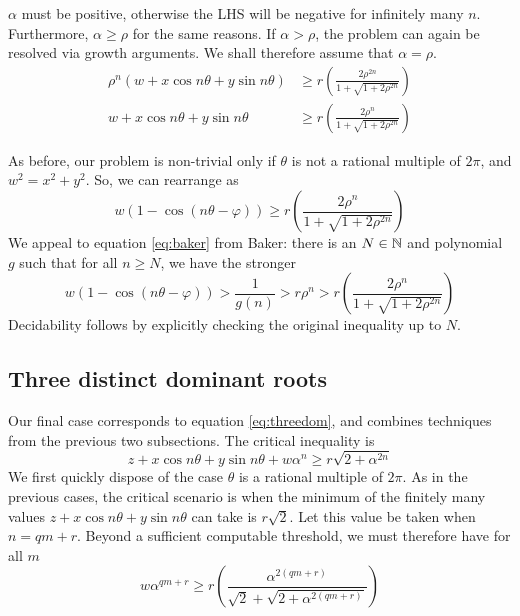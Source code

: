 $\alpha$ must be positive, otherwise the LHS will be negative for infinitely many $n$. Furthermore, $\alpha \ge \rho$ for the same reasons. If $\alpha > \rho$, the problem can again be resolved via growth arguments. We shall therefore assume that $\alpha = \rho$. 
\begin{align}
\rho^n(w + x \cos n\theta + y \sin n \theta) &\ge r\left(\frac{2\rho^{2n}}{1 + \sqrt{1 + 2\rho^{2n}}}\right) \\
w + x \cos n\theta + y \sin n \theta &\ge r\left(\frac{2\rho^{n}}{1 + \sqrt{1 + 2\rho^{2n}}}\right)
\end{align}

As before, our problem is non-trivial only if $\theta$ is not a rational multiple of $2\pi$, and $w^2 = x^2 + y^2$. So, we can rearrange as 
\begin{equation}
w(1 - \cos(n\theta - \varphi)) \ge r\left(\frac{2\rho^{n}}{1 + \sqrt{1 + 2\rho^{2n}}}\right)
\end{equation}
We appeal to equation \ref{eq:baker} from Baker: there is an $N \in \mathbb{N}$ and polynomial $g$ such that for all $n \ge N$, we have the stronger
\begin{equation}
w(1 - \cos(n\theta - \varphi)) > \frac{1}{g(n)} > r \rho^n >  r\left(\frac{2\rho^{n}}{1 + \sqrt{1 + 2\rho^{2n}}}\right)
\end{equation}
Decidability follows by explicitly checking the original inequality up to $N$.

\subsection{Three distinct dominant roots}
Our final case corresponds to equation \ref{eq:threedom}, and combines techniques from the previous two subsections. The critical inequality is
\begin{equation}
z + x\cos n\theta + y\sin n\theta + w\alpha^n \ge r\sqrt{2 + \alpha^{2n}}
\end{equation}
We first quickly dispose of the case $\theta$ is a rational multiple of $2\pi$. As in the previous cases, the critical scenario is when the minimum of the finitely many values $z + x\cos n\theta + y\sin n\theta $ can take is $r\sqrt{2}$. Let this value be taken when $n = qm + r$. Beyond a sufficient computable threshold, we must therefore have for all $m$
\begin{equation}
w\alpha^{qm+r} \ge r\left(\frac{\alpha^{2(qm+r)}}{\sqrt{2}+ \sqrt{2+\alpha^{2(qm+r)}}}\right)
\end{equation}


